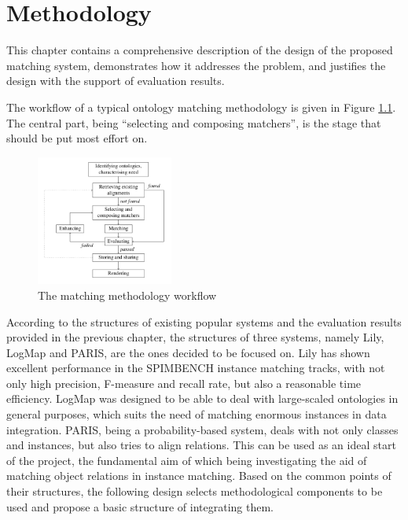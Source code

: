 \chapter{Methodology}

This chapter contains a comprehensive description of the design of the proposed matching system, demonstrates how it addresses the problem, and justifies the design with the support of evaluation results.

The workflow of a typical ontology matching methodology is given in Figure \ref{fig:methodology}. The central part, being \textquotedblleft selecting and composing matchers\textquotedblright, is the stage that should be put most effort on.

\begin{figure}[ht]
\begin{center}
\includegraphics[width=0.4\textwidth]{img/methodology.png}
\caption{The matching methodology workflow}
\label{fig:methodology}
\end{center}
\end{figure}

According to the structures of existing popular systems and the evaluation results provided in the previous chapter, the structures of three systems, namely Lily, LogMap and PARIS, are the ones decided to be focused on. Lily has shown excellent performance in the SPIMBENCH instance matching tracks, with not only high precision, F-measure and recall rate, but also a reasonable time efficiency. LogMap was designed to be able to deal with large-scaled ontologies in general purposes, which suits the need of matching enormous instances in data integration. PARIS, being a probability-based system, deals with not only classes and instances, but also tries to align relations. This can be used as an ideal start of the project, the fundamental aim of which being investigating the aid of matching object relations in instance matching. Based on the common points of their structures, the following design selects methodological components to be used and propose a basic structure of integrating them.

